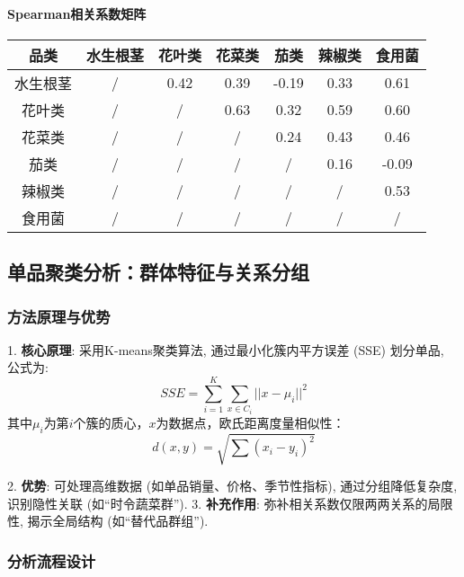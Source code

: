 \documentclass{cumcmthesis}
\begin{document}
\paragraph{Spearman相关系数矩阵}
\begin{table}[H]
\centering
\begin{tabular}{c c c c c c c}
\toprule
品类 & 水生根茎 & 花叶类 & 花菜类 & 茄类 & 辣椒类 & 食用菌 \\
\midrule
水生根茎 & / & 0.42 & 0.39 & -0.19 & 0.33 & 0.61 \\
花叶类 & / & / & 0.63 & 0.32 & 0.59 & 0.60 \\
花菜类 & / & / & / & 0.24 & 0.43 & 0.46 \\
茄类 & / & / & / & / & 0.16 & -0.09 \\
辣椒类 & / & / & / & / & / & 0.53 \\
食用菌 & / & / & / & / & / & / \\
\bottomrule
\end{tabular}
\end{table}


\subsection{单品聚类分析：群体特征与关系分组}
\subsubsection{方法原理与优势}

1. \textbf{核心原理}: 采用K-means聚类算法, 通过最小化簇内平方误差 (SSE) 划分单品, 公式为: 
\begin{equation}
SSE=\sum_{i=1}^{K}\sum_{x\in C_i}||x-\mu_i||^2
\end{equation}  
其中$\mu_i$为第$i$个簇的质心，$x$为数据点，欧氏距离度量相似性：  
\begin{equation}
d(x,y)=\sqrt{\sum (x_i-y_i)^2}
\end{equation}

2. \textbf{优势}: 可处理高维数据 (如单品销量、价格、季节性指标), 通过分组降低复杂度, 识别隐性关联 (如“时令蔬菜群”). 
3. \textbf{补充作用}: 弥补相关系数仅限两两关系的局限性, 揭示全局结构 (如“替代品群组”). 

\subsubsection{分析流程设计}
\end{document}
